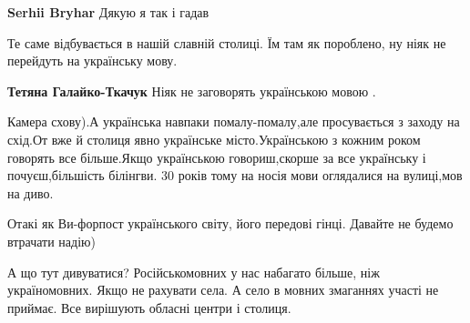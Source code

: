 \begin{itemize}
\begin{itemize}
\textbf{Serhii Bryhar} Дякую я так і гадав
\end{itemize}

 
Те саме відбувається в нашій славній столиці. Їм там як пороблено, ну ніяк не перейдуть на українську мову.


\begin{itemize}
 
\textbf{Тетяна Галайко-Ткачук} Ніяк не заговорять українською мовою .
\end{itemize}

 

Камера схову).А українська навпаки помалу-помалу,але просувається з заходу на
схід.От вже й столиця явно українське місто.Українською з кожним роком говорять
все більше.Якщо українською говориш,скорше за все українську і почуєш,більшість
білінгви. 30 років тому на носія мови оглядалися на вулиці,мов на диво.

Отакі як Ви-форпост українського світу, його передові гінці. Давайте не будемо
втрачати надію)


 

А що тут дивуватися? Російськомовних у нас набагато більше, ніж україномовних.
Якщо не рахувати села. А село в мовних змаганнях участі не приймає. Все
вирішують обласні центри і столиця.

\begin{itemize}
 

\end{itemize}
\end{itemize}
